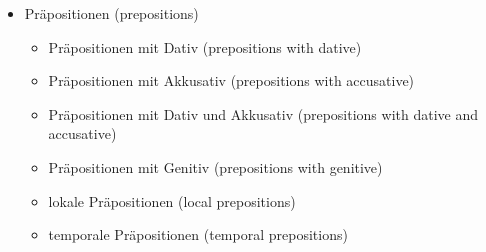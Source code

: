 \documentclass[a4paper]{article}
\begin{document}
\begin{itemize}
\begin{itemize}
                \item Akkusativ {\small (accusative)}
                \begin{itemize}
                    \item direktes Objekt {\small (direct object)}
                    \item Akkusativ nach Präpositionen {\small (accusative after prepositions)}
                    \item temporaler Akkusativ {\small (temporal accusative)}
                \end{itemize}
                
                \item Dativ {\small (dative)}
                \begin{itemize}
                    \item indirektes Objekt {\small (indirect object)}
                    \item Dativ nach Präpositionen {\small (dative after prepositions)}
                    \item freier Dativ {\small (free dative)}
                \end{itemize}
                
                \item Genitiv {\small (genitive)}
                \begin{itemize}
                    \item Genitiv als Attribut {\small (genitive as attribute)}
                    \item Genitiv bei Namen {\small (genitive with names)}
                    \item Präpositionen mit Genitiv {\small (prepositions with genitive)}
                \end{itemize}
            \end{itemize}
            
            \item Präpositionen {\small (prepositions)}
            \begin{itemize}
                \item Präpositionen mit Dativ {\small (prepositions with dative)}
                \item Präpositionen mit Akkusativ {\small (prepositions with accusative)}
                \item Präpositionen mit Dativ und Akkusativ {\small (prepositions with dative and accusative)}
                \item Präpositionen mit Genitiv {\small (prepositions with genitive)}
                \item lokale Präpositionen {\small (local prepositions)}
                \item temporale Präpositionen {\small (temporal prepositions)}
            \end{itemize}
            

\end{itemize}
\end{document}
